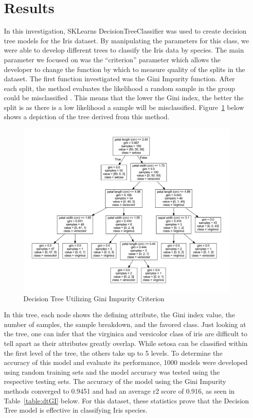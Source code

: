 \documentclass[journal]{IEEEtran}
\begin{document}
\section{Results}

In this investigation, SKLearn\textquotesingle s DecisionTreeClassifier was used to create decision tree models for the Iris dataset. By manipulating the parameters for this class, we were able to develop different trees to classify the Iris data by species. The main parameter we focused on was the “criterion” parameter which allows the developer to change the function by which to measure quality of the splits in the dataset. The first function investigated was the Gini Impurity function. After each split, the method evaluates the likelihood a random sample in the group could be misclassified \cite{b2}. This means that the lower the Gini index, the better the split is as there is a low likelihood a sample will be misclassified. Figure~\ref{fig:dtGI} below shows a depiction of the tree derived from this method.

\begin{figure}[h!]
\includegraphics[scale=0.25]{iris.pdf}
\centering
\caption{Decision Tree Utilizing Gini Impurity Criterion}
\label{fig:dtGI}
\end{figure}

In this tree, each node shows the defining attribute, the Gini index value, the number of samples, the sample breakdown, and the favored class. Just looking at the tree, one can infer that the virginica and versicolor class of iris are difficult to tell apart as their attributes greatly overlap. While setosa can be classified within the first level of the tree, the others take up to 5 levels. To determine the accuracy of this model and evaluate its performance, 1000 models were developed using random training sets and the model accuracy was tested using the respective testing sets. The accuracy of the model using the Gini Impurity methods converged to 0.9451 and had an average r2 score of 0.916, as seen in Table~\ref{table:dtGI} below. For this dataset, these statistics prove that the Decision Tree model is effective in classifying Iris species. 
\end{document}
